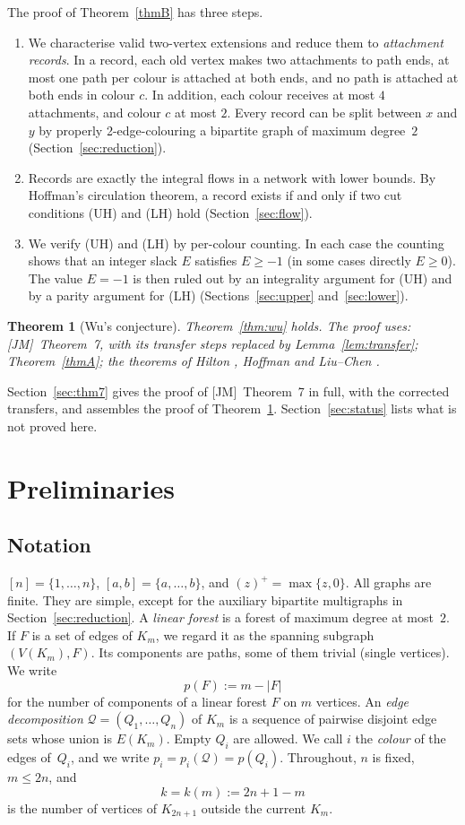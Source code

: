 \documentclass[11pt]{amsart}
\newtheorem{thmL}{Theorem}
\theoremstyle{definition}
\theoremstyle{remark}
\newcommand{\Q}{\mathcal{Q}}
\newcommand{\pos}[1]{\left(#1\right)^{+}}
\newcommand{\JM}{\textup{[JM]}}
\begin{document}
The proof of Theorem~\ref{thmB} has three steps.
\begin{enumerate}[label=(\alph*),leftmargin=*]
\item We characterise valid two-vertex extensions and reduce them to \emph{attachment
records}. In a record, each old vertex makes two attachments to path ends, at most one path per
colour is attached at both ends, and no path is attached at both ends in colour $c$. In
addition, each colour receives at most $4$ attachments, and colour $c$ at most $2$. Every
record can be split between $x$ and $y$ by properly 2-edge-colouring a bipartite graph of
maximum degree~$2$ (Section~\ref{sec:reduction}).
\item Records are exactly the integral flows in a network with lower bounds. By Hoffman's
circulation theorem, a record exists if and only if two cut conditions (UH) and (LH) hold
(Section~\ref{sec:flow}).
\item We verify (UH) and (LH) by per-colour counting. In each case the counting shows that an
integer slack $E$ satisfies $E\ge-1$ (in some cases directly $E\ge0$). The value $E=-1$ is then
ruled out by an integrality argument for (UH) and by a parity argument for (LH)
(Sections~\ref{sec:upper} and~\ref{sec:lower}).
\end{enumerate}

\begin{thmL}[Wu's conjecture]\label{thmC}
Theorem~\ref{thm:wu} holds. The proof uses: \JM\ Theorem~7, with its transfer steps
replaced by Lemma~\ref{lem:transfer}; Theorem~\ref{thmA}; the theorems of Hilton
\cite{Hilton}, Hoffman \cite{Hoffman} and Liu--Chen \cite{LC}.
\end{thmL}

Section~\ref{sec:thm7} gives the proof of \JM\ Theorem~7 in full, with the corrected
transfers, and assembles the proof of Theorem~\ref{thmC}. Section~\ref{sec:status}
lists what is not proved here.

\section{Preliminaries}\label{sec:prelim}

\subsection{Notation}
$[n]=\{1,\dots,n\}$, $[a,b]=\{a,\dots,b\}$, and $\pos{z}=\max\{z,0\}$. All graphs are finite.
They are simple, except for the auxiliary bipartite multigraphs in Section~\ref{sec:reduction}.
A \emph{linear forest} is a forest of maximum degree at most~$2$. If $F$ is a set of edges of
$K_m$, we regard it as the spanning subgraph $(V(K_m),F)$. Its components are paths, some of
them trivial (single vertices). We write
\[
p(F):=m-|F|
\]
for the number of components of a linear forest $F$ on $m$ vertices. An \emph{edge
decomposition} $\Q=(Q_1,\dots,Q_n)$ of $K_m$ is a sequence of pairwise disjoint edge sets whose
union is $E(K_m)$. Empty $Q_i$ are allowed. We call $i$ the \emph{colour} of the edges of~$Q_i$,
and we write $p_i=p_i(\Q)=p(Q_i)$. Throughout, $n$ is fixed, $m\le 2n$, and
\[
k=k(m):=2n+1-m
\]
is the number of vertices of $K_{2n+1}$ outside the current $K_m$.
\end{document}
